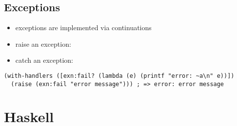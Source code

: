 \documentclass[a4paper,landscape,10pt]{article}
\begin{document}
\begin{multicols*}{2}
  \subsection{Exceptions}

  \begin{itemize}
    \item exceptions are implemented via continuations
    \item raise an exception: 
    \item catch an exception: 
  \end{itemize}

  \begin{lstlisting}[language=Racket]
(with-handlers ([exn:fail? (lambda (e) (printf "error: ~a\n" e))])
  (raise (exn:fail "error message"))) ; => error: error message
  \end{lstlisting}

\end{multicols*}

\clearpage

\section{Haskell}
\end{document}
